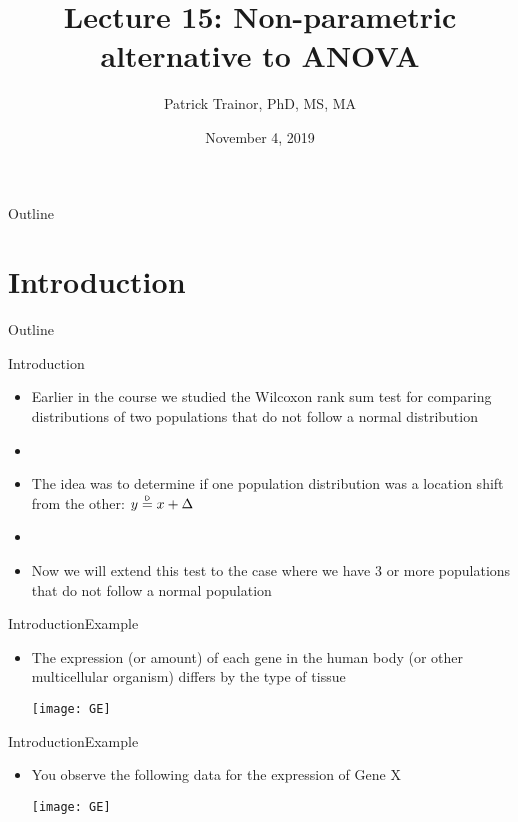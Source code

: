\documentclass[xcolor=dvipsnames]{beamer}
\title[Lecture 15]{Lecture 15: Non-parametric alternative to ANOVA}
\author[Patrick Trainor]{Patrick Trainor, PhD, MS, MA}
\institute[NMSU]{New Mexico State University}
\date{November 4, 2019}
\newcommand\myeq{\mathrel{\overset{\makebox[0pt]{\mbox{\normalfont\tiny\sffamily D}}}{=}}}
\begin{document}
	
\begin{frame}
	\maketitle
\end{frame}

\begin{frame}{Outline}
	\tableofcontents[hideallsubsections]
\end{frame}

\section{Introduction}

\begin{frame}{Outline}
	\tableofcontents[currentsection,subsectionstyle=show/shaded/hide]
\end{frame}

\begin{frame}{Introduction}
	\begin{itemize}
		\item Earlier in the course we studied the Wilcoxon rank sum test for comparing distributions of two populations that do not follow a normal distribution \pause
		\item[]
		\item The idea was to determine if one population distribution was a location shift from the other: $y \myeq x + \Delta$ \pause
		\item[]
		\item Now we will extend this test to the case where we have 3 or more populations that do not follow a normal population
	\end{itemize}
\end{frame}

\begin{frame}{Introduction}{Example}
	\begin{itemize}
		\item The expression (or amount) of each gene in the human body (or other multicellular organism) differs by the type of tissue 
		\begin{center}
			\texttt{[image: GE]}
		\end{center}
	\end{itemize}
\end{frame}

\begin{frame}{Introduction}{Example}
	\begin{itemize}
		\item You observe the following data for the expression of Gene X
		\begin{center}
			\texttt{[image: GE]}
		\end{center}
	\end{itemize}
\end{frame}
\end{document}
